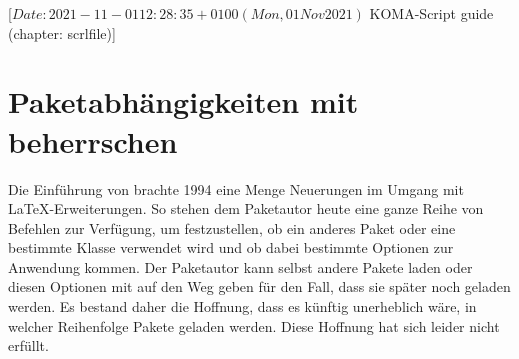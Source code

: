 %
%
%
%
%
%
%
%
% 
%
%
%
%

%
                 [$Date: 2021-11-01 12:28:35 +0100 (Mon, 01 Nov 2021) $
                  KOMA-Script guide (chapter: scrlfile)]

\chapter{Paketabhängigkeiten mit  
  beherrschen}

\BeginIndexGroup
{}

Die Einführung von \LaTeXe{} brachte 1994 eine Menge Neuerungen im Umgang mit
\LaTeX-Erweiterungen. So stehen dem Paketautor heute eine ganze Reihe von
Befehlen zur Verfügung, um festzustellen, ob ein anderes Paket oder eine
bestimmte Klasse verwendet wird und ob dabei bestimmte Optionen zur Anwendung
kommen. Der Paketautor kann selbst andere Pakete laden oder diesen Optionen
mit auf den Weg geben für den Fall, dass sie später noch geladen werden. Es
bestand daher die Hoffnung, dass es künftig unerheblich wäre, in welcher
Reihenfolge Pakete geladen werden. Diese Hoffnung hat sich leider nicht
erfüllt.

